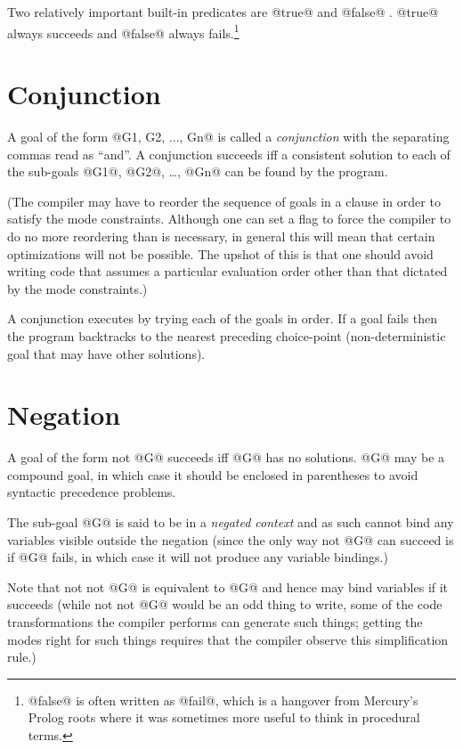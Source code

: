 Two relatively important built-in predicates are @true@ and
@false@ \XXX{}.  @true@ always succeeds and @false@ always fails.\footnote{@false@ is often written as @fail@, which is a hangover
from Mercury's Prolog roots where it was sometimes more useful
to think in procedural terms.}

\section{Conjunction}

A goal of the form @G1, G2, ..., Gn@ is called a \emph{conjunction}
with the separating commas read as ``and''.  A conjunction
succeeds iff a consistent solution to each of the sub-goals @G1@,
@G2@, \ldots, @Gn@ can be found by the program.

(The compiler may have to reorder the sequence of goals in a
clause in order to satisfy the mode constraints.  Although one
can set a flag to force the compiler to do no more reordering
than is necessary, in general this will mean that certain
optimizations will not be possible.  The upshot of this is
that one should avoid writing code that assumes a particular
evaluation order other than that dictated by the mode
constraints.)

A conjunction executes by trying each of the goals in order.
If a goal fails then the program backtracks to the nearest
preceding choice-point (\ie non-deterministic goal that may
have other solutions).

\section{Negation}

A goal of the form not @G@ succeeds iff @G@ has no solutions.  @G@
may be a compound goal, in which case it should be enclosed in
parentheses to avoid syntactic precedence problems.

The sub-goal @G@ is said to be in a \emph{negated context} and as
such cannot bind any variables visible outside the negation
(since the only way not @G@ can succeed is if @G@ fails, in which
case it will not produce any variable bindings.)

Note that not not @G@ is equivalent to @G@ and hence may bind
variables if it succeeds (while not not @G@ would be an odd
thing to write, some of the code transformations the compiler
performs can generate such things; getting the modes right for
such things requires that the compiler observe this
simplification rule.)

